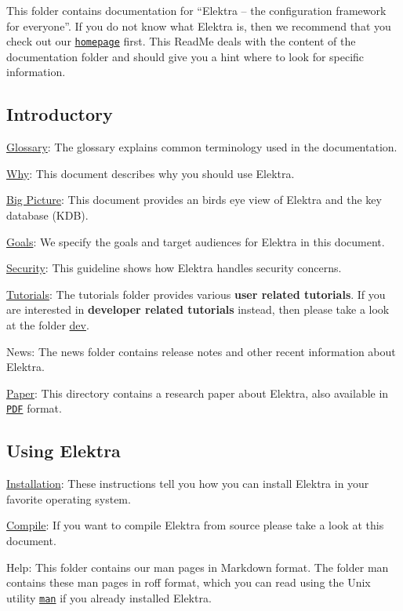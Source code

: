 This folder contains documentation for “\+Elektra – the configuration framework for everyone”. If you do not know what Elektra is, then we recommend that you check out our \href{https://www.libelektra.org/home}{\tt homepage} first. This Read\+Me deals with the content of the documentation folder and should give you a hint where to look for specific information.

\subsection*{Introductory}


\begin{DoxyItemize}
\item \hyperlink{md_doc_help_elektra-glossary_doc_help_elektra-glossary_md}{Glossary}\+: The glossary explains common terminology used in the documentation.
\item \hyperlink{doc_WHY_md}{Why}\+: This document describes why you should use Elektra.
\item \hyperlink{doc_BIGPICTURE_md}{Big Picture}\+: This document provides an birds eye view of Elektra and the key database (K\+DB).
\item \hyperlink{doc_GOALS_md}{Goals}\+: We specify the goals and target audiences for Elektra in this document.
\item \hyperlink{doc_SECURITY_md}{Security}\+: This guideline shows how Elektra handles security concerns.
\item \hyperlink{md_doc_tutorials_README_doc_tutorials_README_md}{Tutorials}\+: The tutorials folder provides various {\bfseries user related tutorials}. If you are interested in {\bfseries developer related tutorials} instead, then please take a look at the folder \hyperlink{md_doc_dev_README_doc_dev_README_md}{dev}.
\item News\+: The news folder contains release notes and other recent information about Elektra.
\item \hyperlink{doc_paper_README_md}{Paper}\+: This directory contains a research paper about Elektra, also available in \href{http://joss.theoj.org/papers/10.21105/joss.00044}{\tt P\+DF} format.
\end{DoxyItemize}

\subsection*{Using Elektra}


\begin{DoxyItemize}
\item \hyperlink{doc_INSTALL_md}{Installation}\+: These instructions tell you how you can install Elektra in your favorite operating system.
\item \hyperlink{doc_COMPILE_md}{Compile}\+: If you want to compile Elektra from source please take a look at this document.
\item Help\+: This folder contains our man pages in Markdown format. The folder man contains these man pages in roff format, which you can read using the Unix utility \href{https://en.wikipedia.org/wiki/Man_page}{\tt {\ttfamily man}} if you already installed Elektra.
\end{DoxyItemize}

